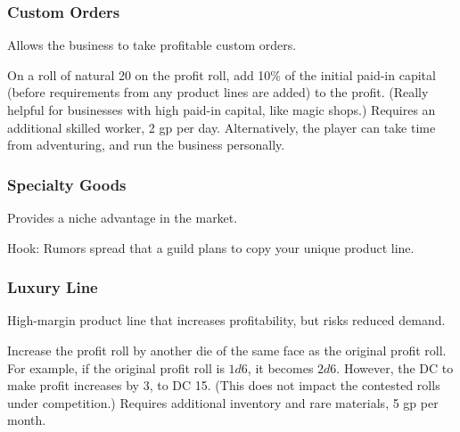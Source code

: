 \documentclass[twocolumn]{dndbook}
\begin{document}
\subsubsection{Custom Orders}

Allows the business to take profitable custom orders.

\begin{DndComment}[color=bgtan2018]{}
	On a roll of natural 20 on the profit roll, add 10\% of the initial paid-in capital (before requirements from any product lines are added) to the profit.
	(Really helpful for businesses with high paid-in capital, like magic shops.)
	Requires an additional skilled worker, 2 gp per day.
	Alternatively, the player can take time from adventuring, and run the business personally.
\end{DndComment}



\subsubsection{Specialty Goods}

Provides a niche advantage in the market.

\begin{DndComment}[color=bgtan2018]{}
\end{DndComment}

Hook: Rumors spread that a guild plans to copy your unique product line.\par


\subsubsection{Luxury Line}

High-margin product line that increases profitability, but risks reduced demand.

\begin{DndComment}[color=bgtan2018]{}
	Increase the profit roll by another die of the same face as the original profit roll.
	For example, if the original profit roll is $1d6$, it becomes $2d6$.
	However, the DC to make profit increases by 3, to DC 15.
	(This does not impact the contested rolls under competition.)
	Requires additional inventory and rare materials, 5 gp per month.
\end{DndComment}
\end{document}
